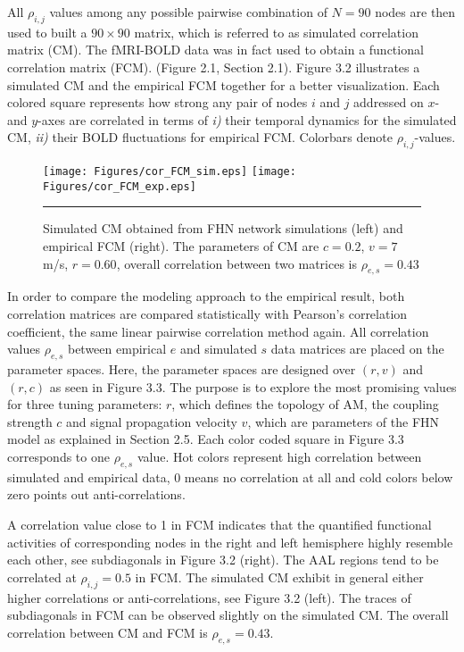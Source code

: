 All $\rho_{i,j}$ values among any possible pairwise combination of $N=90$ nodes are then used to built a $90\times 90$  matrix, which is referred to as simulated correlation matrix (CM). The fMRI-BOLD data was in fact used to obtain a functional correlation matrix (FCM). (Figure 2.1, Section 2.1). Figure 3.2 illustrates a simulated CM and the empirical FCM together for a better visualization. Each colored square represents how strong any pair of nodes $i$ and $j$ addressed on $x$- and $y$-axes are correlated in terms of \textit{i)} their temporal dynamics for the simulated CM, \textit{ii)} their BOLD fluctuations for empirical FCM. Colorbars denote $\rho_{i,j}$-values.


\begin{figure}[htbp]
 
  \centering
	 \texttt{[image: Figures/cor\_FCM\_sim.eps]} 
   	 \texttt{[image: Figures/cor\_FCM\_exp.eps]} 

    \rule{35em}{0.5pt}
  \caption[High Correlated FHN Simulation, FCM]{ Simulated CM obtained from FHN network simulations (left) and empirical FCM (right). The parameters of CM are $c=0.2$, $v=7$ m/s, $r=0.60$, overall correlation between two matrices is $\rho_{e,s} = 0.43$}
      \label{fig:High Correlated FHN Simulation, FCM}
 	
\end{figure}  



In order to compare the modeling approach to the empirical result, both correlation matrices are compared statistically with Pearson's correlation coefficient, the same linear pairwise correlation method again. All correlation values $\rho_{e,s}$ between empirical $e$ and simulated $s$ data matrices are placed on the parameter spaces. Here, the parameter spaces are designed over $(r,v)$ and $(r,c)$ as seen in Figure 3.3. The purpose is to explore the most promising values for three tuning parameters: $r$, which defines the topology of AM, the coupling strength $c$ and signal propagation velocity $v$, which are parameters of the FHN model as explained in Section 2.5.  Each color coded square in Figure 3.3 corresponds to one $\rho_{e,s}$ value. Hot colors represent high correlation between simulated and empirical data, 0 means no correlation at all and cold colors below zero points out anti-correlations.


A correlation value close to 1 in FCM indicates that the quantified functional activities of corresponding nodes in the right and left hemisphere highly resemble each other, see subdiagonals in Figure 3.2 (right). The AAL regions tend to be correlated at $\rho_{i,j}=0.5$ in FCM. The simulated CM exhibit in general either higher correlations or anti-correlations, see Figure 3.2 (left). The traces of subdiagonals in FCM can be observed slightly on the simulated CM. The overall correlation between CM and FCM is $\rho_{e,s}=0.43$. 



